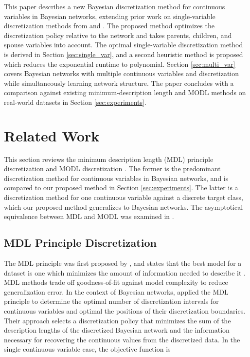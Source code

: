 This paper describes a new Bayesian discretization method for continuous variables in Bayesian networks, extending prior work on single-variable discretization methods from \citet{Boulle_2006} and \citet{Lustgarten_2011}.
The proposed method optimizes the discretization policy relative to the network and takes parents, children, and spouse variables into account.
The optimal single-variable discretization method is derived in Section \ref{sec:single_var}, and a second heuristic method is proposed which reduces the exponential runtime to polynomial.
Section \ref{sec:multi_var} covers Bayesian networks with multiple continuous variables and discretization while simultaneously learning network structure.
The paper concludes with a comparison against existing minimum-description length \citep{Friedman_1996} and MODL \citet{Boulle_2006} methods on real-world datasets in Section \ref{sec:experiments}.


\section{Related Work}
\label{sec:related_work}
This section reviews the minimum description length (MDL) principle discretization \citep{Friedman_1996} and MODL discretization \citep{Boulle_2006}.
The former is the predominant discretization method for continuous variables in Bayesian networks, and is compared to our proposed method in Section \ref{sec:experiments}.
The latter is a discretization method for one continuous variable against a discrete target class, which our proposed method generalizes to Bayesian networks.
The asymptotical equivalence between MDL and MODL was examined in \citep{VL_2000}.

\subsection{MDL Principle Discretization}
The MDL principle was first proposed by \cite{MDL_1978}, and states that the best model for a dataset is one which minimizes the amount of information needed to describe it \citep{Grunwald_2009}.
MDL methods trade off goodness-of-fit against model complexity to reduce generalization error.
In the context of Bayesian networks, \cite{Friedman_1996} applied the MDL principle to determine the optimal number of discretization intervals for continuous variables and optimal the positions of their discretization boundaries.
Their approach selects a discretization policy that minimizes the sum of the description lengths of the discretized Bayesian network and the information necessary for recovering the continuous values from the discretized data.
In the single continuous variable case, the objective function is

